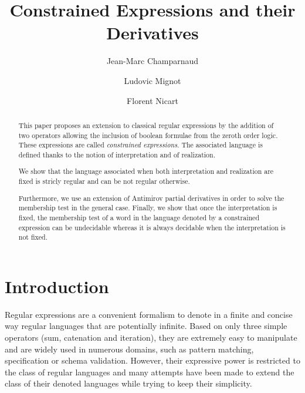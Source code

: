 \documentclass[a4paper]{llncs}
\begin{document}
 

  \title{Constrained Expressions and their Derivatives}
  
  \author{
    Jean-Marc Champarnaud \and
    Ludovic Mignot
    \and Florent Nicart
  } 

  
  \maketitle
  


  \begin{abstract} 
This paper proposes an extension to classical regular expressions by the addition of two operators allowing the inclusion of boolean formulae from the zeroth order logic. These expressions are called \emph{constrained expressions}. 
The associated language is defined thanks to the notion of interpretation and of realization.

We show that the language associated when both interpretation and realization are fixed is stricly regular and can be not regular otherwise.

    Furthermore, we use an extension of Antimirov partial derivatives in order to solve the membership test in the general case.
Finally, we show that once the interpretation is fixed, the membership test of a word in the language denoted by a constrained expression can be undecidable whereas it is always decidable when the interpretation is not fixed. 
  \end{abstract}

\section{Introduction}\label{se:int}

	Regular expressions are a convenient formalism to denote in a finite and concise way regular languages that are potentially infinite. Based on only three simple operators (sum, catenation and iteration), they are extremely easy to manipulate and are widely used in numerous domains, such as pattern matching, specification or schema validation. However, their expressive power is restricted to the class of regular languages and many attempts have been made to extend the class of their denoted languages while trying to keep their simplicity.
  
\end{document}
